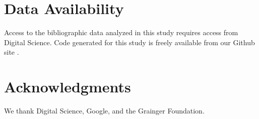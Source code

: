 \documentclass[12pt, oneside]{article}   	%
\begin{document}
	\section*{Data Availability} Access to the bibliographic data analyzed in this study requires access from Digital Science. Code generated for this study is freely available from our Github site \citep{Park2021}.
	
	\section*{Acknowledgments} We thank Digital Science, Google, and the Grainger Foundation.
	
	
	
\end{document}
